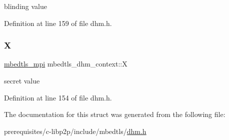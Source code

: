blinding value 

Definition at line 159 of file dhm.\+h.

\mbox{\label{structmbedtls__dhm__context_a175e534f5a3a4483ebcc4d7ec852d4cd}} 
\subsubsection{\texorpdfstring{X}{X}}
{\footnotesize\ttfamily \mbox{\hyperlink{structmbedtls__mpi}{mbedtls\+\_\+mpi}} mbedtls\+\_\+dhm\+\_\+context\+::X}

secret value 

Definition at line 154 of file dhm.\+h.



The documentation for this struct was generated from the following file\+:\begin{DoxyCompactItemize}
\item 
prerequisites/c-\/libp2p/include/mbedtls/\mbox{\hyperlink{dhm_8h}{dhm.\+h}}\end{DoxyCompactItemize}
